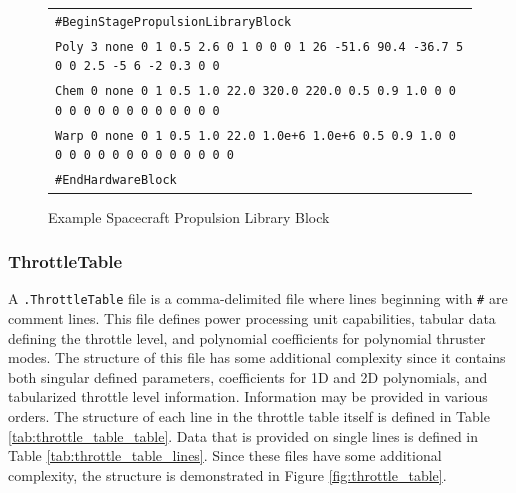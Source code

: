     
\begin{figure}[ht]
    \centering
    \begin{tabular}{|l|}
        \hline
        {\tt \#BeginStagePropulsionLibraryBlock} \\
        {\tt Poly 3 none 0 1 0.5 2.6 0 1 0 0 0 1 26 -51.6 90.4 -36.7 5 0 0 2.5 -5 6 -2 0.3 0 0} \\
        {\tt Chem 0 none 0 1 0.5 1.0 22.0 320.0 220.0 0.5 0.9 1.0 0 0 0 0 0 0 0 0 0 0 0 0 0 0} \\
        {\tt Warp 0 none 0 1 0.5 1.0 22.0 1.0e+6 1.0e+6 0.5 0.9 1.0 0 0 0 0 0 0 0 0 0 0 0 0 0 0} \\
        {\tt \#EndHardwareBlock} \\
        \hline
    \end{tabular}
    \caption{Example Spacecraft Propulsion Library Block}
    \label{fig:config_propulsionlibrary_block}
\end{figure}

    \newpage
\subsubsection{ThrottleTable}
\label{sec:throttle_table_info}
A {\tt .ThrottleTable} file is a comma-delimited file where lines beginning with {\tt \#} are comment lines. This file defines power processing unit capabilities, tabular data defining the throttle level, and polynomial coefficients for polynomial thruster modes. The structure of this file has some additional complexity since it contains both singular defined parameters, coefficients for 1D and 2D polynomials, and tabularized throttle level information. Information may be provided in various orders. The structure of each line in the throttle table itself is defined in Table \ref{tab:throttle_table_table}. Data that is provided on single lines is defined in Table \ref{tab:throttle_table_lines}. Since these files have some additional complexity, the structure is demonstrated in Figure \ref{fig:throttle_table}.

